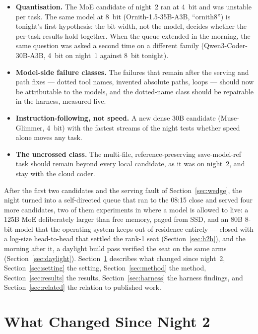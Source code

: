 \begin{itemize}
	\item \textbf{Quantisation.} The MoE candidate of night~2 ran at 4~bit and was unstable per task. The same
	model at 8~bit (Ornith-1.5-35B-A3B, ``ornith8'') is tonight's first hypothesis: the bit width, not the model,
	decides whether the per-task results hold together. When the queue extended in the morning, the same question
	was asked a second time on a different family (Qwen3-Coder-30B-A3B, 4~bit on night~1 against 8~bit tonight).
	\item \textbf{Model-side failure classes.} The failures that remain after the serving and path fixes --- dotted
	tool names, invented absolute paths, loops --- should now be attributable to the models, and the dotted-name
	class should be repairable in the harness, measured live.
	\item \textbf{Instruction-following, not speed.} A new dense 30B candidate (Muse-Glimmer, 4~bit) with the
	fastest streams of the night tests whether speed alone moves any task.
	\item \textbf{The uncrossed class.} The multi-file, reference-preserving save-model-ref task should remain
	beyond every local candidate, as it was on night~2, and stay with the cloud coder.
\end{itemize}

After the first two candidates and the serving fault of Section~\ref{sec:wedge}, the night turned into a
self-directed queue that ran to the 08:15 close and served four more candidates, two of them experiments in
where a model is allowed to live: a 125B MoE deliberately larger than free memory, paged from SSD, and an 80B
8-bit model that the operating system keeps out of residence entirely --- closed with a log-size
head-to-head that settled the rank-1 seat (Section~\ref{sec:h2h}), and the morning after it, a daylight build
pass verified the seat on the same arms (Section~\ref{sec:daylight}). Section~\ref{sec:changes} describes what changed since
night~2, Section~\ref{sec:setting} the setting, Section~\ref{sec:method} the method, Section~\ref{sec:results}
the results, Section~\ref{sec:harness} the harness findings, and Section~\ref{sec:related} the relation to
published work.

\section{What Changed Since Night 2}\label{sec:changes}

